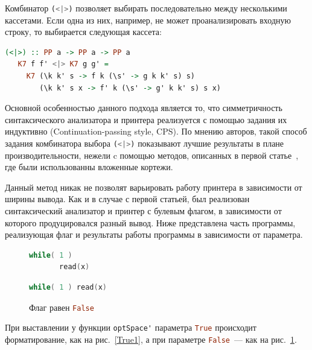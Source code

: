 Комбинатор \lstinline[language=Haskell]{(<|>)} позволяет выбирать последовательно 
между несколькими кассетами. Если одна из них, например, не может проанализировать 
входную строку, то выбирается следующая кассета:

\begin{lstlisting}[mathescape,language=Haskell]
   (<|>) :: PP a -> PP a -> PP a
   K7 f f' <|> K7 g g' =
     K7 (\k k' s -> f k (\s' -> g k k' s) s)
        (\k k' s x -> f' k (\s' -> g' k k' s) s x)
\end{lstlisting}

Основной особенностью данного подхода является то, что симметричность синтаксического 
анализатора и принтера реализуется с помощью задания их индуктивно (Continuation-passing style, CPS). 
По мнению авторов, такой способ задания комбинатора выбора \lstinline[language=Haskell]{(<|>)} 
показывают лучшие результаты в плане производительности, нежели c помощью методов, описанных 
в первой статье~\cite{Rendel}, где были использованны вложенные кортежи. 

Данный метод никак не позволят варьировать работу принтера в зависимости от ширины вывода. 
Как и в случае с первой статьей, был реализован синтаксический анализатор и принтер с булевым флагом, 
в зависимости от которого продуцировался разный вывод. Ниже представлена часть программы, 
реализующая флаг и результаты работы программы в зависимости от параметра.

\begin{figure}[h]
  \centering
  \begin{minipage}[h]{0.4\textwidth}
    \begin{lstlisting}[language=C]
    while( 1 )
       read(x)
    \end{lstlisting}
    \caption{Флаг равен \lstinline[language=Haskell]{True}}
    \label{True1}
  \end{minipage}
  \hfill
  \begin{minipage}[h]{0.4\textwidth}
    \begin{lstlisting}[language=C]
    while( 1 ) read(x)
    \end{lstlisting}
    \caption{Флаг равен \lstinline[language=Haskell]{False}}
    \label{False1}
  \end{minipage}
\end{figure}

При выставлении у функции \lstinline[language=Haskell]{optSpace'} параметра \lstinline[language=Haskell]{True} 
происходит форматирование, как на рис.~\ref{True1}, а при параметре \lstinline[language=Haskell]{False}~--- как на рис.~\ref{False1}.

